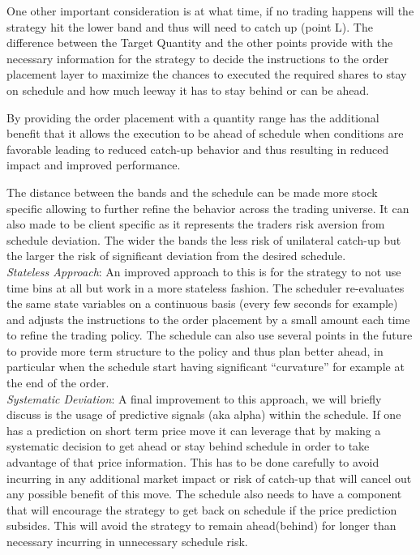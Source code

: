 One other important consideration is at what time, if no trading happens will the strategy hit the lower band and thus will need to catch up (point L). The difference between the Target Quantity and the other points provide with the necessary  information for the strategy to decide the instructions to the order placement layer to maximize the chances to executed the required shares to stay on schedule and how much leeway it has to stay behind or can be ahead.


By providing the order placement with a quantity range has the additional benefit that it allows the execution to be ahead of schedule when conditions are favorable leading to reduced catch-up behavior and thus resulting in reduced impact and improved performance.


The distance between the bands and the schedule can be made more stock specific allowing to further refine the behavior across the trading universe. It can also made to be client specific as it represents the traders risk aversion from schedule deviation. The wider the bands the less risk of unilateral catch-up but the larger the risk of significant deviation from the desired schedule. \\


\noindent\emph{Stateless Approach}: An improved approach to this is for the strategy to not use time bins at all but work in a more stateless fashion. The scheduler re-evaluates the same state variables on a continuous basis (every few seconds for example) and adjusts the instructions to the order placement by a small amount each time to refine the trading policy. The schedule can also use several points in the future to provide more term structure to the policy and thus plan better ahead, in particular when the schedule start having significant ``curvature'' for example at the end of the order. \\


\noindent\emph{Systematic Deviation}: A final improvement to this approach, we will briefly discuss is the usage of predictive signals (aka alpha) within the schedule. If one has a prediction on short term price move it can leverage that by making a systematic decision to get ahead or stay behind schedule in order to take advantage of that price information. This has to be done carefully to avoid incurring in any additional market impact or risk of catch-up that will cancel out any possible benefit of this move. The schedule also needs to have a component that will encourage the strategy to get back on schedule if the price prediction subsides. This will avoid the strategy to remain ahead(behind) for longer than necessary incurring in unnecessary schedule risk.



